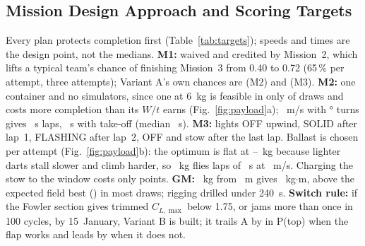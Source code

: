 \subsection{Mission Design Approach and Scoring Targets}
Every plan protects completion first (Table~\ref{tab:targets}); speeds and times are the design point, not the medians.
\textbf{M1:} waived and credited by Mission~2, which lifts a typical team's chance of finishing Mission~3 from 0.40 to 0.72 (65\,\% per attempt, three attempts); Variant A's own chances are \sPMtwoDone{} (M2) and \sPMthreeDone{} (M3).
\textbf{M2:} one container and no simulators, since one at 6~kg is feasible in only \pSimFeas{} of draws and costs more completion than its $W/t$ earns (Fig.~\ref{fig:payload}a); \nMtwoV~m/s with \nMtwoBank° turns gives \nMtwoLap~s laps, \nMtwoTimeDP~s with take-off (median \nMtwoTime~s).
\textbf{M3:} lights OFF upwind, SOLID after lap~1, FLASHING after lap~2, OFF and stow after the last lap. Ballast is chosen per attempt (Fig.~\ref{fig:payload}b): the optimum is flat at \pMthreeLo--\pMthreeHi~kg because lighter darts stall slower and climb harder, so \nMthreeMass~kg flies \nMthreeLaps{} laps of \nMthreeLap~s at \nMthreeV~m/s. Charging the stow to the window costs only \pStowFree{} points.
\textbf{GM:} \nDeclMed~kg from \nDrop~m gives \nGMprod~kg$\cdot$m, above the expected field best (\sFieldGMexp) in most draws; rigging drilled under 240~s.
\textbf{Switch rule:} if the Fowler section gives trimmed $C_{L,\max}$ below 1.75, or jams more than once in 100 cycles, by 15~January, Variant B is built; it trails A by \sRegB{} in P(top) when the flap works and leads by \sRegA{} when it does not.
